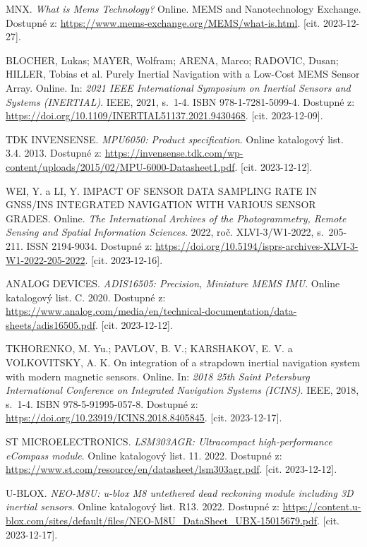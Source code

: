 \begin{thebibliography}{99}
MNX. \textit{What is Mems Technology?} Online. MEMS and Nanotechnology Exchange. Dostupné z: \url{https://www.mems-exchange.org/MEMS/what-is.html}. [cit. 2023-12-27].

BLOCHER, Lukas; MAYER, Wolfram; ARENA, Marco; RADOVIC, Dusan; HILLER, Tobias et al. Purely Inertial Navigation with a Low-Cost MEMS Sensor Array. Online. In: \textit{2021 IEEE International Symposium on Inertial Sensors and Systems (INERTIAL)}. IEEE, 2021, s.~1-4. ISBN 978-1-7281-5099-4. Dostupné z: \url{https://doi.org/10.1109/INERTIAL51137.2021.9430468}. [cit. 2023-12-09].

TDK INVENSENSE. \textit{MPU6050: Product specification}. Online katalogový list. 3.4. 2013. Dostupné z: \url{https://invensense.tdk.com/wp-content/uploads/2015/02/MPU-6000-Datasheet1.pdf}. [cit. 2023-12-12].

WEI, Y. a LI, Y. IMPACT OF SENSOR DATA SAMPLING RATE IN GNSS/INS INTEGRATED NAVIGATION WITH VARIOUS SENSOR GRADES. Online. \textit{The International Archives of the Photogrammetry, Remote Sensing and Spatial Information Sciences}. 2022, roč. XLVI-3/W1-2022, s.~205-211. ISSN 2194-9034. Dostupné z: \url{https://doi.org/10.5194/isprs-archives-XLVI-3-W1-2022-205-2022}. [cit. 2023-12-16].

ANALOG DEVICES. \textit{ADIS16505: Precision, Miniature MEMS IMU}. Online katalogový list. C. 2020. Dostupné z: \url{https://www.analog.com/media/en/technical-documentation/data-sheets/adis16505.pdf}. [cit. 2023-12-12].

TKHORENKO, M. Yu.; PAVLOV, B. V.; KARSHAKOV, E. V. a VOLKOVITSKY, A. K. On integration of a strapdown inertial navigation system with modern magnetic sensors. Online. In: \textit{2018 25th Saint Petersburg International Conference on Integrated Navigation Systems (ICINS)}. IEEE, 2018, s.~1-4. ISBN 978-5-91995-057-8. Dostupné z: \url{https://doi.org/10.23919/ICINS.2018.8405845}. [cit. 2023-12-17].

ST MICROELECTRONICS. \textit{LSM303AGR: Ultracompact high-performance eCompass module}. Online katalogový list. 11. 2022. Dostupné z: \url{https://www.st.com/resource/en/datasheet/lsm303agr.pdf}. [cit. 2023-12-12].

U-BLOX. \textit{NEO-M8U: u-blox M8 untethered dead reckoning module including 3D inertial sensors}. Online katalogový list. R13. 2022. Dostupné z: \url{https://content.u-blox.com/sites/default/files/NEO-M8U\_DataSheet\_UBX-15015679.pdf}. [cit. 2023-12-17].


\end{thebibliography}
